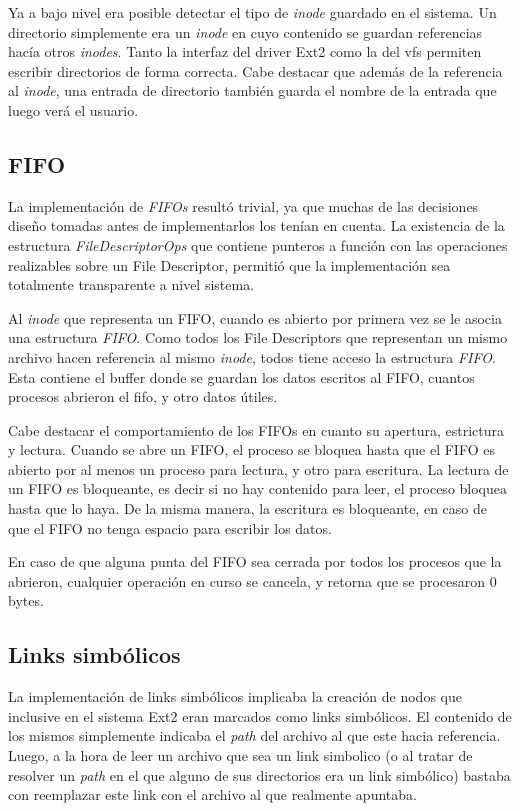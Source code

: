 \documentclass[a4paper,10pt]{article}
\begin{document}
Ya a bajo nivel era posible detectar el tipo de \textit{inode} guardado en el sistema. Un directorio simplemente era
un \textit{inode} en cuyo contenido se guardan referencias hacía otros \textit{inodes}. Tanto la interfaz del driver Ext2 como la del
vfs permiten escribir directorios de forma correcta. Cabe destacar que además de la referencia al \textit{inode}, una entrada
de directorio también guarda el nombre de la entrada que luego verá el usuario.

\subsection{FIFO}
La implementación de \textit{FIFOs} resultó trivial, ya que muchas de las decisiones diseño tomadas antes de implementarlos los tenían en cuenta.
La existencia de la estructura \textit{FileDescriptorOps} que contiene punteros a función con las operaciones realizables sobre un File Descriptor,
 permitió que la implementación sea totalmente transparente a nivel sistema.

Al \textit{inode} que representa un FIFO, cuando es abierto por primera vez se le asocia una estructura \textit{FIFO}.
Como todos los File Descriptors que representan un mismo archivo hacen referencia al mismo \textit{inode}, todos tiene acceso la estructura \textit{FIFO}.
Esta contiene el buffer donde se guardan los datos escritos al FIFO, cuantos procesos abrieron el fifo, y otro datos útiles.

Cabe destacar el comportamiento de los FIFOs en cuanto su apertura, estrictura y lectura.
Cuando se abre un FIFO, el proceso se bloquea hasta que el FIFO es abierto por al menos un proceso para lectura, y otro para escritura.
La lectura de un FIFO es bloqueante, es decir si no hay contenido para leer, el proceso bloquea hasta que lo haya.
De la misma manera, la escritura es bloqueante, en caso de que el FIFO no tenga espacio para escribir los datos.

En caso de que alguna punta del FIFO sea cerrada por todos los procesos que la abrieron, cualquier operación en curso se cancela, y retorna que se procesaron 0 bytes.

\subsection{Links simbólicos}
La implementación de links simbólicos implicaba la creación de nodos que inclusive en el sistema Ext2 eran marcados
como links simbólicos. El contenido de los mismos simplemente indicaba el \textit{path} del archivo al que este
hacia referencia.
Luego, a la hora de leer un archivo que sea un link simbolico (o al tratar de resolver un \textit{path} en el que alguno
de sus directorios era un link simbólico) bastaba con reemplazar este link con el archivo al que realmente
apuntaba.
\end{document}
